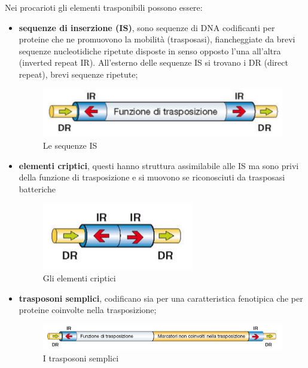 \documentclass[11pt]{book}
\begin{document}
Nei procarioti gli elementi trasponibili possono essere: 
\begin{itemize}
\item \textbf{sequenze di inserzione (IS)}, sono sequenze di DNA codificanti per proteine che ne promuovono la mobilità (trasposasi), fiancheggiate da brevi sequenze nucleotidiche ripetute disposte in senso opposto l’una all’altra (inverted repeat IR). All’esterno delle sequenze IS si trovano i DR (direct repeat), brevi sequenze ripetute;

\begin{figure}[htp]
\centering
\includegraphics[scale=0.4]{img/Sequenze IS.png}
\caption{Le sequenze IS}
\label{}
\end{figure}

\item \textbf{elementi criptici}, questi hanno struttura assimilabile alle IS ma sono privi della funzione di trasposizione e si muovono se riconosciuti da trasposasi batteriche

\begin{figure}[htp]
\centering
\includegraphics[scale=0.4]{img/Elementi criptici.png}
\caption{Gli elementi criptici}
\label{}
\end{figure}

\item \textbf{trasposoni semplici}, codificano sia per una caratteristica fenotipica che per proteine coinvolte nella trasposizione;

\begin{figure}[htp]
\centering
\includegraphics[scale=0.4]{img/Trasposoni semplici.png}
\caption{I trasposoni semplici}
\label{}
\end{figure}


\end{itemize}
\end{document}
